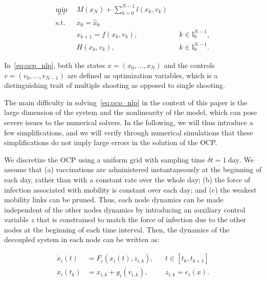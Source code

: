 \begin{subequations}
    \begin{align}
        \min_{x,v} \ \ & M(x_N)+\sum_{k=0}^{N-1} l(x_k,v_k)  \\ 
        \mathrm{s.t.} \ \ & x_0 = \hat x_0 \\
        & x_{k+1} = f(x_k,v_k), && k\in \mathbb{I}_0^{N-1}, \\
        &H(x_k,v_k), && k\in \mathbb{I}_0^{N-1}.
    \end{align}
        \label{eq:ocp_nlp}
\end{subequations}

In~\eqref{eq:ocp_nlp}, both the states $x=(x_0,\ldots,x_N)$ and the controls $v=(v_0,\ldots,v_{N-1})$ are defined as optimization variables, which is a distinguishing trait of multiple shooting as opposed to single shooting. 

The main difficulty in solving~\eqref{eq:ocp_nlp} in the context of this paper is the large dimension of the system and the nonlinearity of the model, which can pose severe issues to the numerical solvers. In the following, we will thus introduce a few simplifications, and we will verify through numerical simulations that these simplifications do not imply large errors in the solution of the OCP. 

We discretize the OCP using a uniform grid with sampling time $\delta t=1\ \mathrm{day}$. We assume that (a) vaccinations are administered instantaneously at the beginning of each day, rather than with a constant rate over the whole day; (b) the force of infection associated with mobility is constant over each day; and (c) the weakest mobility links can be pruned. Thus, each node dynamics can be made independent of the other nodes dynamics by introducing an auxiliary control variable $z$ that is constrained to match the force of infection due to the other nodes at the beginning of each time interval. Then, the dynamics of the decoupled system in each node can be written as:

\begin{align*}
    \dot x_i(t) &= F_i(x_i(t),z_{i,k}), && t\in[t_k,t_{k+1}] \\
    x_i(t_k) &= x_{i,k} + g_i(v_{i,k}), && z_{i,k} = e_i(x).
\end{align*}



